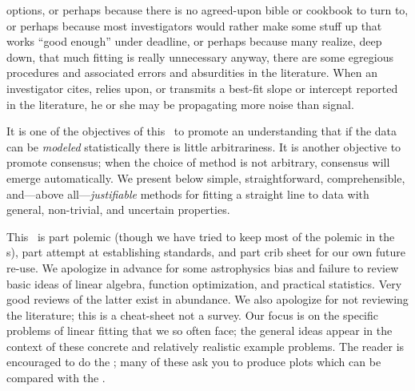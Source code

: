 \documentclass[12pt,twoside,pdftex]{article}
\begin{document}
options, or perhaps because there is no agreed-upon bible or cookbook
to turn to, or perhaps because most investigators would rather make
some stuff up that works ``good enough'' under deadline, or perhaps
because many realize, deep down, that much fitting is really
unnecessary anyway, there are some egregious procedures and associated
errors and absurdities in the literature. When an investigator cites,
relies upon, or transmits a best-fit slope or intercept reported in
the literature, he or she may be propagating more noise than signal.

It is one of the objectives of this \documentname\ to promote an
understanding that if the data can be \emph{modeled} statistically
there is little arbitrariness.  It is another objective to promote
consensus; when the choice of method is not arbitrary, consensus will
emerge automatically.  We present below simple, straightforward,
comprehensible, and---above all---\emph{justifiable} methods for
fitting a straight line to data with general, non-trivial, and
uncertain properties.

This \documentname\ is part polemic (though we have tried to keep most
of the polemic in the \notename s), part attempt at establishing
standards, and part crib sheet for our own future re-use.  We
apologize in advance for some astrophysics bias and failure to review
basic ideas of linear algebra, function optimization, and practical
statistics.  Very good reviews of the latter exist in
abundance.  We also apologize for not reviewing the
literature; this is a cheat-sheet not a survey.  Our focus is on the
specific problems of linear fitting that we so often face; the general
ideas appear in the context of these concrete and relatively realistic
example problems.  The reader is encouraged to do the \problemnames;
many of these ask you to produce plots which can be compared with the
\figurenames.
\end{document}
